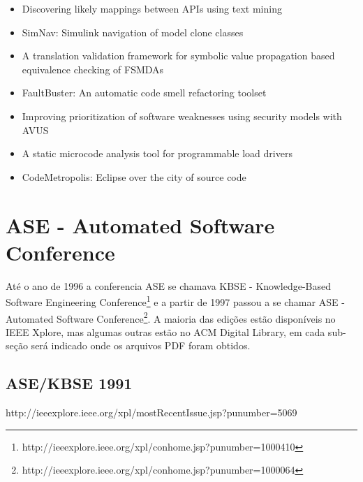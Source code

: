 {\begin{itemize}[itemsep=-1ex]
  \item Discovering likely mappings between APIs using text mining
  \item SimNav: Simulink navigation of model clone classes
  \item A translation validation framework for symbolic value propagation based equivalence checking of FSMDAs
  \item FaultBuster: An automatic code smell refactoring toolset
  \item Improving prioritization of software weaknesses using security models with AVUS
  \item A static microcode analysis tool for programmable load drivers
  \item CodeMetropolis: Eclipse over the city of source code
\end{itemize}
}

\section{ASE - Automated Software Conference}

Até o ano de 1996 a conferencia ASE se chamava KBSE - Knowledge-Based Software
Engineering
Conference\footnote{http://ieeexplore.ieee.org/xpl/conhome.jsp?punumber=1000410}
e a partir de 1997 passou a se chamar ASE - Automated Software
Conference\footnote{http://ieeexplore.ieee.org/xpl/conhome.jsp?punumber=1000064}.
A maioria das edições estão disponíveis no IEEE Xplore, mas algumas outras
estão no ACM Digital Library, em cada sub-seção será indicado onde os arquivos
PDF foram obtidos.

\subsection{ASE/KBSE 1991}

http://ieeexplore.ieee.org/xpl/mostRecentIssue.jsp?punumber=5069

